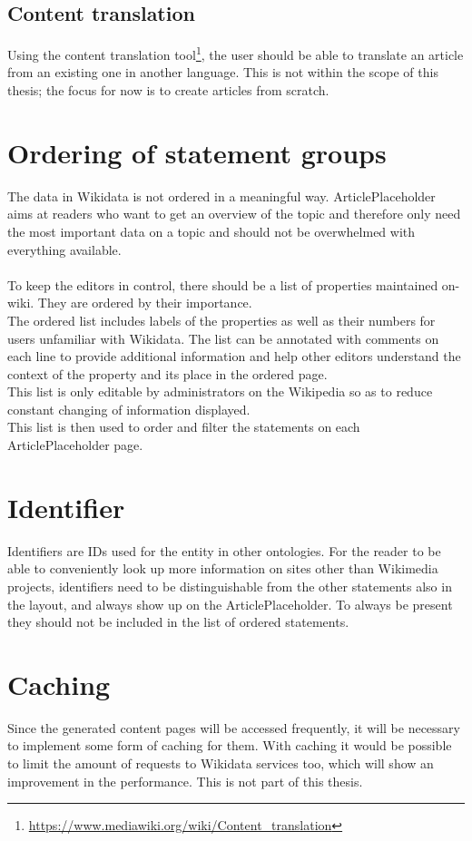 \subsection{Content translation}
Using the content translation tool\footnote{\url{https://www.mediawiki.org/wiki/Content_translation}}, the user should be able to translate an article from an existing one in another language. This is not within the scope of this thesis; the focus for now is to create articles from scratch. \\

\section{Ordering of statement groups}
The data in Wikidata is not ordered in a meaningful way. ArticlePlaceholder aims at readers who want to get an overview of the topic and therefore only need the most important data on a topic and should not be overwhelmed with everything available. \\
\\
To keep the editors in control, there should be a list of properties maintained on-wiki. They are ordered by their importance. \\
The ordered list includes labels of the properties as well as their numbers for users unfamiliar with Wikidata. The list can be annotated with comments on each line to provide additional information and help other editors understand the context of the property and its place in the ordered page. \\
This list is only editable by administrators on the Wikipedia so as to reduce constant changing of information displayed. \\
This list is then used to order and filter the statements on each ArticlePlaceholder page. 

\section {Identifier}
Identifiers are IDs used for the entity in other ontologies. For the reader to be able to conveniently look up more information on sites other than Wikimedia projects, identifiers need to be distinguishable from the other statements also in the layout, and always show up on the ArticlePlaceholder. To always be present they should not be included in the list of ordered statements. 

\section{Caching}
Since the generated content pages will be accessed frequently,  it will be necessary to implement some form of caching for them. With caching it would be possible to limit the amount of requests to Wikidata services too, which will show an improvement in the performance. This is not part of this thesis.

